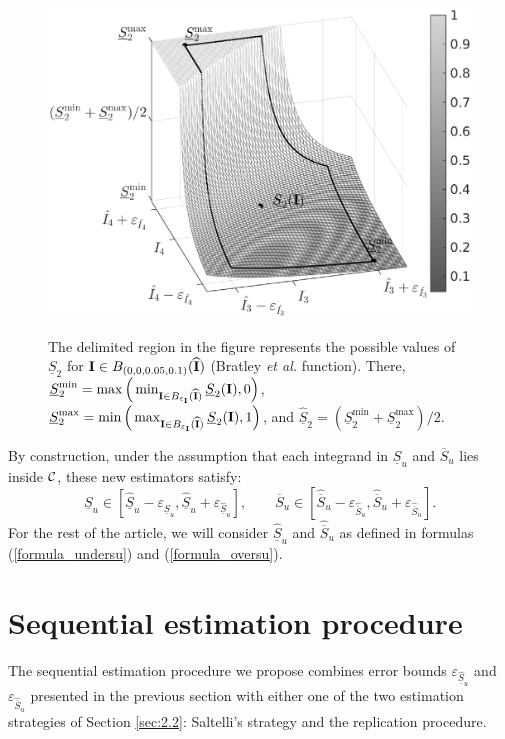 \begin{figure}[t]
\caption{The delimited region in the figure represents the possible values of $\underline{S}_2$ for $\boldsymbol{\mathbf{I}}\in B_{(0,0,0.05,0.1)}(\widehat{\boldsymbol{\mathbf{I}}})$ (Bratley \textit{et al.} function). There, $\underline{S}_2^{\min}=\max\Big{(}\min_{\boldsymbol{\mathbf{I}}\in B_{\varepsilon_{\boldsymbol{\mathbf{I}}}}(\widehat{\boldsymbol{\mathbf{I}}})} \underline{S}_2(\boldsymbol{\mathbf{I}}),0\Big{)}$, $\underline{S}_2^{\max}=\min\Big{(}\max_{\boldsymbol{\mathbf{I}}\in B_{\varepsilon_{\boldsymbol{\mathbf{I}}}}(\widehat{\boldsymbol{\mathbf{I}}})} \underline{S}_2(\boldsymbol{\mathbf{I}}),1\Big{)}$, and $\widehat{\underline{S}}_2=(\underline{S}_2^{\min}+\underline{S}_2^{\max})/2$.}
\centering
\includegraphics[width=.5\textwidth]{estimator_3d_small.eps}
\label{fig:1}       %
\end{figure}

By construction, under the assumption that each integrand in $\underline{S}_u$ and $\overline{S}_u$ lies inside $\mathcal{C}$, these new estimators satisfy: \[ \underline{S}_u\in \left[ \widehat{\underline{S}}_u - \varepsilon_{\widehat{\underline{S}}_u}, \widehat{\underline{S}}_u + \varepsilon_{\widehat{\underline{S}}_u} \right], \qquad \overline{S}_u\in \left[ \widehat{\overline{S}}_u - \varepsilon_{\widehat{\overline{S}}_u}, \widehat{\overline{S}}_u + \varepsilon_{\widehat{\overline{S}}_u} \right] .\]
 For the rest of the article, we will consider $\widehat{\underline{S}}_u$ and $\widehat{\overline{S}}_u$ as defined in formulas (\ref{formula_undersu}) and (\ref{formula_oversu}).

\section{Sequential estimation procedure}
\label{sec:4}
The sequential estimation procedure we propose combines error bounds $\varepsilon_{\widehat{\underline{S}}_u}$ and $\varepsilon_{\widehat{\overline{S}}_u}$ presented in the previous section with either one of the two estimation strategies of Section \ref{sec:2.2}: Saltelli's strategy and the replication procedure. 

